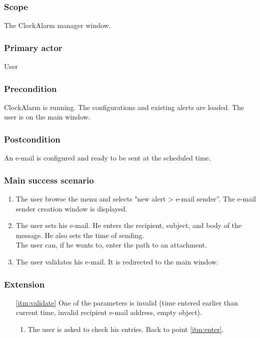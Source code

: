 \subsubsection{Scope}
The ClockAlarm manager window.
\subsubsection{Primary actor}
User
\subsubsection{Precondition}
ClockAlarm is running. The configurations and existing alerts are loaded. The user is on the main window.
\subsubsection{Postcondition}
An e-mail is configured and ready to be sent at the scheduled time.
\subsubsection{Main success scenario}
\begin{enumerate}
	\item The user browse the menu and selects "new alert > e-mail sender''. The e-mail sender creation window is displayed. 
	\item \label{itm:enter} The user sets his e-mail. He enters the recipient, subject, and body of the message. He also sets the time of sending. \\The user can, if he wants to, enter the path to an attachment.
	\item \label{itm:validate} The user validates his e-mail. It is redirected to the main window.
\end{enumerate}
\subsubsection{Extension}
\begin{enumerate}
	\item[\ref{itm:validate}] One of the parameters is invalid (time entered earlier than current time, invalid recipient e-mail address, empty object).
	\begin{enumerate}[i]
		\item The user is asked to check his entries. Back to point \ref{itm:enter}.
	\end{enumerate}
\end{enumerate}